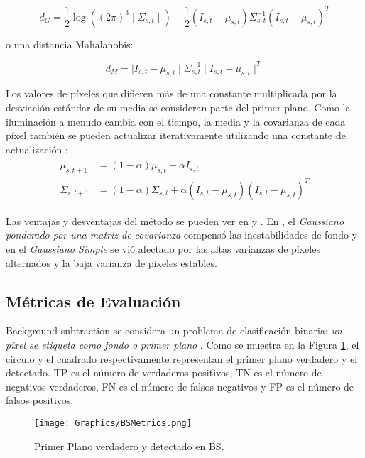 $$d_G = \frac{1}{2}\log((2\pi)^3\mid\Sigma_{s,t}\mid)+\frac{1}{2}(I_{s,t}-\mu_{s,t})\Sigma_{s,t}^{-1}(I_{s,t}-\mu_{s,t})^T$$

o una distancia Mahalanobis:

$$d_M = \mid I_{s,t}-\mu_{s,t}\mid\Sigma_{s,t}^{-1}\mid I_{s,t}-\mu_{s,t}\mid^T$$

Los valores de píxeles que difieren más de una constante multiplicada por la desviación estándar de su media se consideran parte del primer plano. Como la iluminación a menudo cambia con el tiempo, la media y la covarianza de cada píxel también se pueden actualizar iterativamente utilizando una constante de actualización \cite{YannickPierreMarcBrunoHeleneChristophe}:
\begin{gather*}
    \begin{split}
        \mu_{s,t+1} & = (1-\alpha)\mu_{s,t}+\alpha I_{s,t}\\
        \Sigma_{s,t+1} & = (1-\alpha)\Sigma_{s,t}+\alpha(I_{s,t}-\mu_{s,t})(I_{s,t}-\mu_{s,t})^T
    \end{split}
\end{gather*}

Las ventajas y desventajas del método se pueden ver en \cite{BenezethJodoinEmileLaurentRosenberger} y \cite{GreffBrandoKrauStrickerClua}. En \cite{BenezethJodoinEmileLaurentRosenberger}, el \textit{Gaussiano ponderado por una matriz de covarianza} compensó las inestabilidades de fondo y en \cite{GreffBrandoKrauStrickerClua} el \textit{Gaussiano Simple} se vió afectado por las altas varianzas de píxeles alternados y la baja varianza de píxeles estables.

\subsection{Métricas de Evaluación}

Background subtraction se considera un problema de clasificación binaria: \textit {un píxel se etiqueta como fondo o primer plano} \cite{GuangleTaoJiandanPingWenwu}. Como se muestra en la Figura \ref{fig:BSMetrics}, el círculo y el cuadrado respectivamente representan el primer plano verdadero y el detectado. TP es el número de verdaderos positivos, TN es el número de negativos verdaderos, FN es el número de falsos negativos y FP es el número de falsos positivos.\\

\begin{figure}[!h]
    \centering
    \texttt{[image: Graphics/BSMetrics.png]}
    \caption{Primer Plano verdadero y detectado en BS.}
    \label{fig:BSMetrics}
\end{figure}

